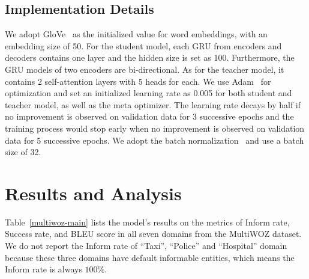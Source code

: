 \documentclass[letterpaper]{article}
\begin{document}
\subsection*{Implementation Details}
We adopt GloVe~\citep{pennington2014glove} as the initialized value for word embeddings, with an embedding size of 50. For the student model, each GRU from encoders and decoders contains one layer and the hidden size is set as 100. Furthermore, the GRU models of two encoders are bi-directional. As for the teacher model, it contains 2 self-attention layers with 5 heads for each. We use Adam~\citep{kingma2014adam} for optimization and set an initialized learning rate as 0.005 for both student and teacher model, as well as the meta optimizer. The learning rate decays by half if no improvement is observed on validation data for 3 successive epochs and the training process would stop early when no improvement is observed on validation data for 5 successive epochs. We adopt the batch normalization~\citep{ioffe2015batch} and use a batch size of 32.









\section*{Results and Analysis}

Table~\ref{multiwoz-main} lists the model's results on the metrics of Inform rate, Success rate, and BLEU score in all seven domains from the MultiWOZ dataset. We do not report the Inform rate of ``Taxi'', ``Police'' and ``Hospital'' domain because these three domains have default informable entities, which means the Inform rate is always $100\%$.
\end{document}
